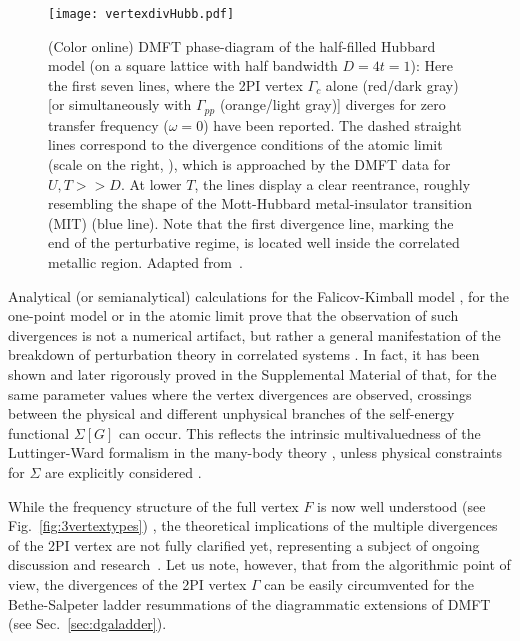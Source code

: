 \documentclass[rmp,aps,reprint,amsmath,amssymb,superscriptaddress,showpacs,nofootinbib]{revtex4-1}
\begin{document}
\begin{figure}[tb]
  \centering
  \texttt{[image: vertexdivHubb.pdf]}
    \caption{(Color online) DMFT phase-diagram of the half-filled Hubbard model (on a square lattice with half bandwidth $D=4t=1$): Here the first seven lines, where the 2PI vertex $\Gamma_{c}$  alone (red/dark gray) [or simultaneously with $\Gamma_{pp}$ (orange/light gray)] diverges for zero transfer frequency ($\omega=0$) have been reported. The dashed straight lines correspond to the divergence conditions of the atomic limit (scale on the right, ), which is approached by the DMFT data for $U, T >> D$. At lower $T$, the lines display a clear reentrance, roughly resembling the shape of the Mott-Hubbard metal-insulator transition (MIT) (blue line). Note that the first divergence line, marking the end of the perturbative regime, is located well inside the correlated metallic region. Adapted from~\cite{Schaefer2016c}.}
  \label{fig:vertexdivHubb}
\end{figure}
 
Analytical (or semianalytical) calculations for the  Falicov-Kimball model \cite{Schafer2013,Janis2014,Ribic2016,Schaefer2016c}, for the one-point model \cite{Stan2015} or in the atomic limit \cite{Schafer2013,Schaefer2016c} prove that the observation of such divergences is not a numerical artifact, but  rather a general manifestation of the breakdown of perturbation theory in correlated systems \cite{Gunnarsson2017}. In fact, it has been shown  \cite{Kozik2015, Stan2015, Schaefer2016c, Gunnarsson2017,Vucicevic2018} and later rigorously proved in the Supplemental Material of  that, for the same parameter values where the vertex divergences are observed, crossings between the physical and different unphysical branches of the self-energy functional $\Sigma[G]$ can occur. This reflects the  intrinsic multivaluedness of the Luttinger-Ward formalism in the many-body theory \cite{Keiter2000,Kozik2015}, unless physical constraints for $\Sigma$ are  explicitly considered \cite{Pruschke2001,Potthoff2006,Tarantino2017}. 

 
While the frequency structure of the full vertex $F$ is now well understood (see Fig.~\ref{fig:3vertextypes}) \cite{Rohringer2012,Wentzell2016}, the theoretical implications of the multiple divergences of the 2PI vertex are not fully clarified yet, representing a subject of ongoing discussion and research~\cite{Kozik2015,Stan2015,Rossi2016,Gunnarsson2016,Schaefer2016c,Tarantino2017,Gunnarsson2017, Vucicevic2018,Chalupa2017}. Let us note, however, that from the algorithmic point of view, the divergences of the 2PI vertex $\Gamma$ can be easily circumvented for the Bethe-Salpeter ladder resummations of the diagrammatic extensions of DMFT (see Sec.~\ref{sec:dgaladder}).
\end{document}
